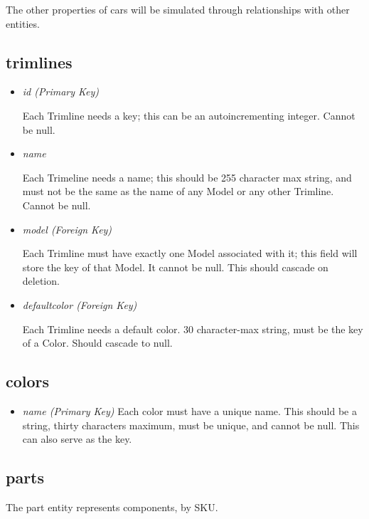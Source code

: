 \documentclass[11pt,letterpaper,oneside]{amsart}
\begin{document}
The other properties of cars will be simulated through relationships with other entities.

\subsection*{trimlines}

\begin{itemize}
	\item \emph{id (Primary Key)}
	
	Each Trimline needs a key; this can be an autoincrementing integer. Cannot be null.
	
	\item \emph{name}
	
	Each Trimeline needs a name; this should be 255 character max string, and must not be the same as the name of any Model or any other Trimline.  Cannot be null.

	\item \emph{model (Foreign Key)}
	
	Each Trimline must have exactly one Model associated with it; this field will store the key of that Model.  It cannot be null.  This should cascade on deletion.
	
	\item \emph{default{\textunderscore}color (Foreign Key)}
	
	Each Trimline needs a default color.  30 character-max string, must be the key of a Color.  Should cascade to null.

\end{itemize}

\subsection*{colors}

\begin{itemize}
	\item \emph	{name (Primary Key)}
		Each color must have a unique name.  This should be a string, thirty characters maximum, must be unique, and cannot be null.  This can also serve as the key.
		
\end{itemize}

\subsection*{parts}

The part entity represents components, by SKU.
\end{document}
